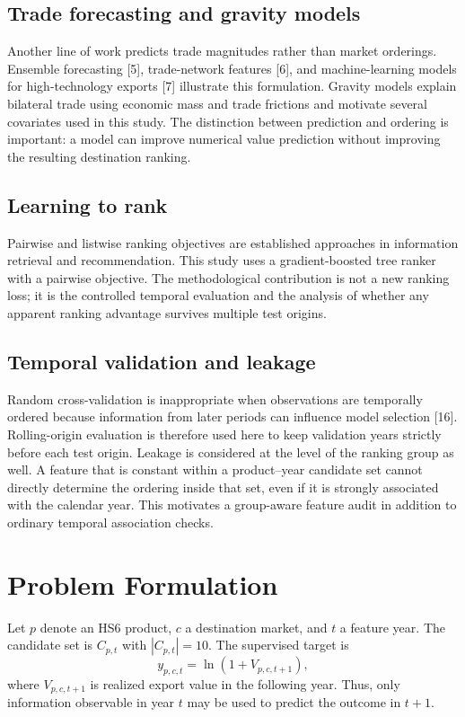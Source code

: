 \documentclass[conference]{IEEEtran}
\begin{document}
\subsection{Trade forecasting and gravity models}

Another line of work predicts trade magnitudes rather than market orderings. Ensemble forecasting [5], trade-network features [6], and machine-learning models for high-technology exports [7] illustrate this formulation. Gravity models explain bilateral trade using economic mass and trade frictions and motivate several covariates used in this study. The distinction between prediction and ordering is important: a model can improve numerical value prediction without improving the resulting destination ranking.

\subsection{Learning to rank}

Pairwise and listwise ranking objectives are established approaches in information retrieval and recommendation. This study uses a gradient-boosted tree ranker with a pairwise objective. The methodological contribution is not a new ranking loss; it is the controlled temporal evaluation and the analysis of whether any apparent ranking advantage survives multiple test origins.

\subsection{Temporal validation and leakage}

Random cross-validation is inappropriate when observations are temporally ordered because information from later periods can influence model selection [16]. Rolling-origin evaluation is therefore used here to keep validation years strictly before each test origin. Leakage is considered at the level of the ranking group as well. A feature that is constant within a product--year candidate set cannot directly determine the ordering inside that set, even if it is strongly associated with the calendar year. This motivates a group-aware feature audit in addition to ordinary temporal association checks.

\section{Problem Formulation}

Let $p$ denote an HS6 product, $c$ a destination market, and $t$ a feature year. The candidate set is $C_{p,t}$ with $|C_{p,t}|=10$. The supervised target is
\begin{equation}
y_{p,c,t}=\ln(1+V_{p,c,t+1}),
\end{equation}
where $V_{p,c,t+1}$ is realized export value in the following year. Thus, only information observable in year $t$ may be used to predict the outcome in $t+1$.
\end{document}
